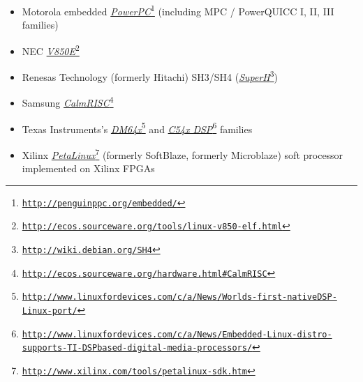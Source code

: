 \begin{latin}
\begin{itemize}
\begin{itemize}
		\item Motorola embedded \emph{\url{PowerPC}}\footnote{\texttt{\url{http://penguinppc.org/embedded/}}}
			(including MPC / PowerQUICC I, II, III families)
		\item NEC \emph{\url{V850E}}\footnote{\texttt{\url{http://ecos.sourceware.org/tools/linux-v850-elf.html}}}
		\item Renesas Technology (formerly Hitachi) SH3/SH4 (\emph{\url{SuperH}}\footnote{\texttt{\url{http://wiki.debian.org/SH4}}})
		\item Samsung \emph{\url{CalmRISC}}\footnote{\texttt{\url{http://ecos.sourceware.org/hardware.html#CalmRISC}}}
		\item Texas Instruments's 
		\emph{\url{DM64x}}\footnote{\texttt{\url{http://www.linuxfordevices.com/c/a/News/Worlds-first-nativeDSP-Linux-port/}}}
			and \emph{\url{C54x DSP}}\footnote{\texttt{\url{http://www.linuxfordevices.com/c/a/News/Embedded-Linux-distro-supports-TI-DSPbased-digital-media-processors/}}} families
		\item Xilinx \emph{\url{PetaLinux}}\footnote{\texttt{\url{http://www.xilinx.com/tools/petalinux-sdk.htm}}}
			(formerly SoftBlaze, formerly Microblaze) soft processor implemented on Xilinx FPGAs
	\end{itemize}


\end{itemize}
\end{latin}
